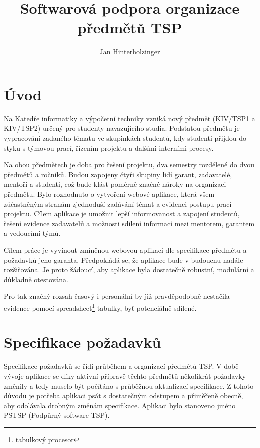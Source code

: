 \documentclass[czech,BP]{thesiskiv}
\author{Jan Hinterholzinger}
\title{Softwarová podpora organizace předmětů TSP}
\begin{document}
	\makenomenclature
%
\maketitle
\tableofcontents
\chapter{Úvod}
	\par Na Katedře informatiky a výpočetní techniky vzniká nový předmět  (KIV/TSP1 a KIV/TSP2) určený pro studenty navazujícího studia. Podstatou předmětu je vypracování zadaného tématu ve skupinkách studentů, kdy studenti přijdou do styku s týmovou prací, řízením projektu a dalšími interními procesy.
	\par Na obou předmětech je doba pro řešení projektu, dva semestry rozdělené do dvou předmětů a ročníků. Budou zapojeny čtyři skupiny lidí garant, zadavatelé, mentoři a studenti, což bude klást poměrně značné nároky na organizaci předmětu. Bylo rozhodnuto o vytvoření webové aplikace, která všem zúčastněným stranám zjednoduší zadávání témat a evidenci postupu prací projektu. Cílem aplikace je umožnit lepší informovanost a zapojení studentů, řešení evidence zadavatelů a možnosti sdílení informací mezi mentorem, garantem a vedoucími týmů.
	\par Cílem práce je vyvinout zmíněnou webovou aplikaci dle specifikace předmětu a požadavků jeho garanta. Předpokládá se, že aplikace bude v budoucnu nadále rozšiřována. Je proto žádoucí, aby aplikace byla dostatečně robustní, modulární a důkladně otestována.
	\par Pro tak značný rozsah časový i personální by již pravděpodobně nestačila evidence pomocí spreadsheet\footnote{tabulkový procesor} tabulky, byť potenciálně sdílené.
\chapter{Specifikace požadavků}
\par Specifikace požadavků se řídí průběhem a organizací předmětů TSP. V době vývoje aplikace se díky aktivní přípravě těchto předmětů několikrát požadavky změnily a tedy muselo být počítáno s průběžnou aktualizací specifikace. Z tohoto důvodu je potřeba aplikaci psát s dostatečným odstupem a přiměřeně obecně, aby odolávala drobným změnám specifikace. Aplikaci bylo stanoveno jméno PSTSP (Podpůrný software TSP).
\end{document}
